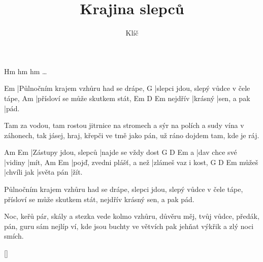 \documentclass{song}
\title{Krajina slepců}
\author{Klíč}
\begin{document}
\strophe*
Hm hm hm \ldots
\endstrophe

\strophe
Em
|Půlnočním krajem vzhůru had se drápe,
G
|slepci jdou, slepý vůdce v čele tápe,
Am
|přísloví se může skutkem stát,
        Em      D           Em
nejdřív |krásný |sen, a pak |pád.
\endstrophe

\strophe*
Tam za vodou, tam rostou jitrnice na stromech
a sýr na polích a sudy vína v záhonech,
tak jásej, hraj, křepči ve tmě jako pán,
už ráno dojdem tam, kde je ráj.
\endstrophe

Am                    Em
|Zástupy jdou, slepců |najde se vždy dost
  G             D       Em
a |dav chce své |vidiny |mít,
Am                         Em
|pojď, zvedni plášť, a než |zlámeš vaz i kost,
      G           D          Em
můžeš |chvíli jak |světa pán |žít.
\endstrophe

\strophe*
Půlnočním krajem vzhůru had se drápe,
slepci jdou, slepý vůdce v čele tápe,
přísloví se může skutkem stát,
nejdřív krásný sen, a pak pád.
\endstrophe

\strophe*
Noc, keřů pár, skály a stezka vede kolmo vzhůru,
důvěru měj, tvůj vůdce, předák, pán, guru
sám nejlíp ví, kde jsou buchty ve větvích
pak jehňat výkřik a zlý noci smích.
\endstrophe

\ref{}
\end{document}
